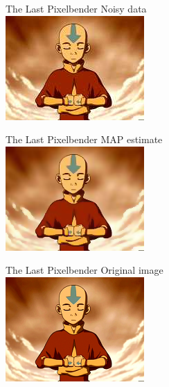 \documentclass[10pt]{beamer}
\begin{document}
\begin{frame}{The Last Pixelbender}
\centering
Noisy data
\\
\includegraphics[height=40ex]{results/aang1-tmp} 
\end{frame}
\begin{frame}{The Last Pixelbender}
\centering
MAP estimate\vphantom{y}
\\
\includegraphics[height=40ex]{results/aang1-fixed}
\end{frame}
\begin{frame}{The Last Pixelbender}
\centering
Original image
\\
\includegraphics[height=40ex]{results/aang1} 
\end{frame}
\end{document}
